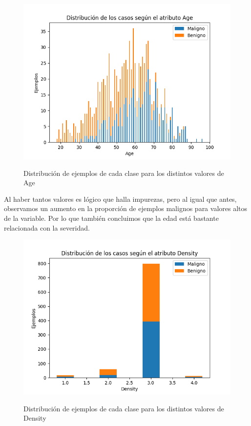 \documentclass[oneside]{book}
\begin{document}
\begin{figure}[H]
  \centering
  \caption{Distribución de ejemplos de cada clase para los distintos valores de Age}
  \includegraphics[width=120mm]{figures/visualizacion/age}
  \label{fig:age}
\end{figure}

Al haber tantos valores es lógico que halla impurezas, pero al igual
que antes, observamos un aumento en la proporción de ejemplos malignos
para valores altos de la variable. Por lo que también concluimos que
la edad está bastante relacionada con la severidad.

\begin{figure}[H]
  \centering
  \caption{Distribución de ejemplos de cada clase para los distintos valores de Density}
  \includegraphics[width=120mm]{figures/visualizacion/density}
  \label{fig:density}
\end{figure}
\end{document}
